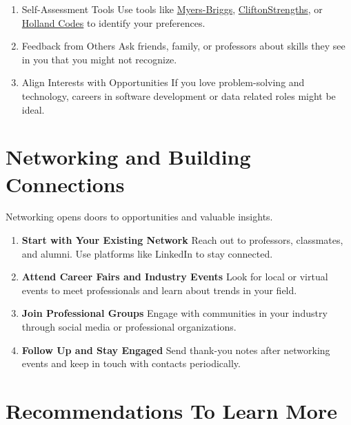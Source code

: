 \documentclass[
  letterpaper,
  DIV=11,
  numbers=noendperiod]{scrreprt}
\begin{document}
\begin{enumerate}
\def\labelenumi{\arabic{enumi}.}
\item
  Self-Assessment Tools Use tools like
  \href{https://blossomup.co/lp/personality-test/?utm_medium=cpc&utm_source=google&utm_campaign=21149437428&gad_source=1&gclid=Cj0KCQiAgdC6BhCgARIsAPWNWH1sHwpdSrnkS5EMBOhrr_dlUEXXZ8apuD8-5SEJuFdRYkw8dj4qzRsaAn8iEALw_wcB}{Myers-Briggs},
  \href{https://www.gallup.com/cliftonstrengths/en/252137/home.aspx}{CliftonStrengths},
  or
  \href{https://www.roguecc.edu/counseling/hollandcodes/about.asp}{Holland
  Codes} to identify your preferences.
\item
  Feedback from Others Ask friends, family, or professors about skills
  they see in you that you might not recognize.
\item
  Align Interests with Opportunities If you love problem-solving and
  technology, careers in software development or data related roles
  might be ideal.
\end{enumerate}

\section{Networking and Building
Connections}\label{networking-and-building-connections}

Networking opens doors to opportunities and valuable insights.

\begin{enumerate}
\def\labelenumi{\arabic{enumi}.}
\item
  \textbf{Start with Your Existing Network} Reach out to professors,
  classmates, and alumni. Use platforms like LinkedIn to stay connected.
\item
  \textbf{Attend Career Fairs and Industry Events} Look for local or
  virtual events to meet professionals and learn about trends in your
  field.
\item
  \textbf{Join Professional Groups} Engage with communities in your
  industry through social media or professional organizations.
\item
  \textbf{Follow Up and Stay Engaged} Send thank-you notes after
  networking events and keep in touch with contacts periodically.
\end{enumerate}

\section*{Recommendations To Learn
More}\label{recommendations-to-learn-more}
\end{document}
